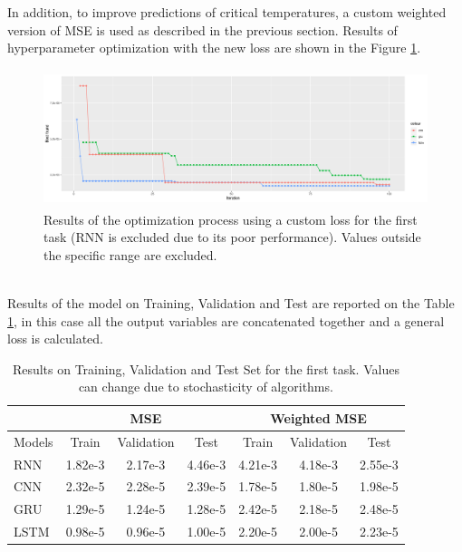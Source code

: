 In addition, to improve predictions of critical temperatures, a custom weighted version of MSE is used as described in the previous section. Results of hyperparameter optimization with the new loss are shown in the Figure \ref{fig:automl_custom}.\\
\begin{figure}[!h]
    \centering
    \includegraphics[width=\linewidth, height=4cm]{imgs/comparison_MSE_new_loss.png}
    \caption{Results of the optimization process using a custom loss for the first task (RNN is excluded due to its poor performance). Values outside the specific range are excluded.}
    \label{fig:automl_custom}
\end{figure}\\ %

Results of the model on Training, Validation and Test are reported on the Table \ref{tab:first}, in this case all the output variables are concatenated together and a general loss is calculated.
\begin{table}[!h]
  \centering
  \begin{tabular}{|l|c|c|c|c|c|c|}
    \hline
           & \multicolumn{3}{|c|}{MSE}      & \multicolumn{3}{|c|}{Weighted MSE} \\
    \hline
    Models & Train   & Validation & Test    & Train   & Validation & Test \\
    \hline
    RNN    & 1.82e-3 & 2.17e-3    & 4.46e-3 & 4.21e-3 & 4.18e-3    & 2.55e-3\\
    CNN    & 2.32e-5 & 2.28e-5    & 2.39e-5 & 1.78e-5 & 1.80e-5    & 1.98e-5\\
    GRU    & 1.29e-5 & 1.24e-5    & 1.28e-5 & 2.42e-5 & 2.18e-5    & 2.48e-5\\
    LSTM   & 0.98e-5 & 0.96e-5    & 1.00e-5 & 2.20e-5 & 2.00e-5    & 2.23e-5\\
    \hline
  \end{tabular}
  \caption{Results on Training, Validation and Test Set for the first task. Values can change due to stochasticity of algorithms.}
  \label{tab:first}
\end{table}\\

